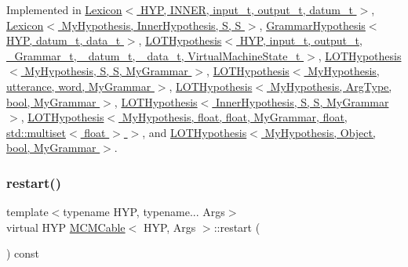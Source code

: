Implemented in \hyperlink{class_lexicon_afa8ea51bbd16df5f46557fe10db84980}{Lexicon$<$ H\+Y\+P, I\+N\+N\+E\+R, input\+\_\+t, output\+\_\+t, datum\+\_\+t $>$}, \hyperlink{class_lexicon_afa8ea51bbd16df5f46557fe10db84980}{Lexicon$<$ My\+Hypothesis, Inner\+Hypothesis, S, S $>$}, \hyperlink{class_grammar_hypothesis_aab60215dfe06a059389db9c7f95e9ce7}{Grammar\+Hypothesis$<$ H\+Y\+P, datum\+\_\+t, data\+\_\+t $>$}, \hyperlink{class_l_o_t_hypothesis_a9a03abc8a6d96995c0f13524f8500747}{L\+O\+T\+Hypothesis$<$ H\+Y\+P, input\+\_\+t, output\+\_\+t, \+\_\+\+Grammar\+\_\+t, \+\_\+datum\+\_\+t, \+\_\+data\+\_\+t, Virtual\+Machine\+State\+\_\+t $>$}, \hyperlink{class_l_o_t_hypothesis_a9a03abc8a6d96995c0f13524f8500747}{L\+O\+T\+Hypothesis$<$ My\+Hypothesis, S, S, My\+Grammar $>$}, \hyperlink{class_l_o_t_hypothesis_a9a03abc8a6d96995c0f13524f8500747}{L\+O\+T\+Hypothesis$<$ My\+Hypothesis, utterance, word, My\+Grammar $>$}, \hyperlink{class_l_o_t_hypothesis_a9a03abc8a6d96995c0f13524f8500747}{L\+O\+T\+Hypothesis$<$ My\+Hypothesis, Arg\+Type, bool, My\+Grammar $>$}, \hyperlink{class_l_o_t_hypothesis_a9a03abc8a6d96995c0f13524f8500747}{L\+O\+T\+Hypothesis$<$ Inner\+Hypothesis, S, S, My\+Grammar $>$}, \hyperlink{class_l_o_t_hypothesis_a9a03abc8a6d96995c0f13524f8500747}{L\+O\+T\+Hypothesis$<$ My\+Hypothesis, float, float, My\+Grammar, float, std\+::multiset$<$ float $>$ $>$}, and \hyperlink{class_l_o_t_hypothesis_a9a03abc8a6d96995c0f13524f8500747}{L\+O\+T\+Hypothesis$<$ My\+Hypothesis, Object, bool, My\+Grammar $>$}.

\mbox{\label{class_m_c_m_cable_a220d6c4ca73e20441c14fa5bd3e090d3}} 
\subsubsection{\texorpdfstring{restart()}{restart()}}
{\footnotesize\ttfamily template$<$typename H\+YP, typename... Args$>$ \\
virtual H\+YP \hyperlink{class_m_c_m_cable}{M\+C\+M\+Cable}$<$ H\+YP, Args $>$\+::restart (\begin{DoxyParamCaption}{ }\end{DoxyParamCaption}) const\hspace{0.3cm}{\ttfamily [pure virtual]}}



